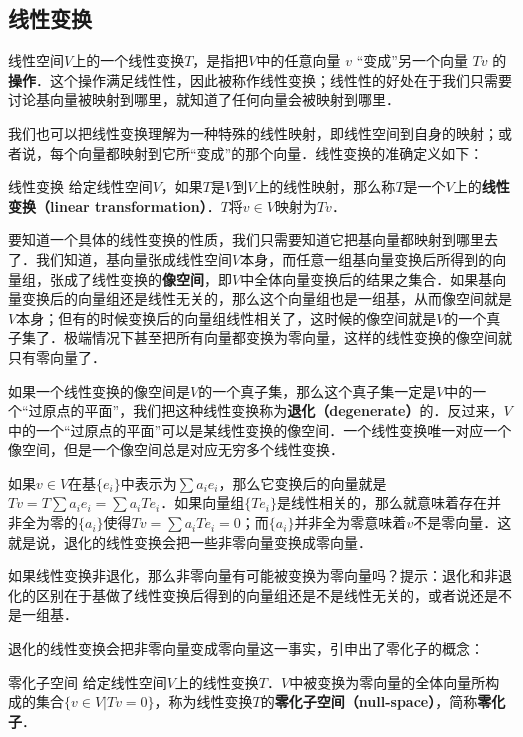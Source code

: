 \subsection{线性变换}
线性空间$V$上的一个线性变换$T$，是指把$V$中的任意向量 ${v}$ “变成”另一个向量 $T {v}$ 的\textbf{操作}．这个操作满足线性性，因此被称作线性变换；线性性的好处在于我们只需要讨论基向量被映射到哪里，就知道了任何向量会被映射到哪里．

我们也可以把线性变换理解为一种特殊的线性映射，即线性空间到自身的映射；或者说，每个向量都映射到它所“变成”的那个向量．线性变换的准确定义如下：

\begin{definition}{线性变换}
给定线性空间$V$，如果$T$是$V$到$V$上的线性映射，那么称$T$是一个$V$上的\textbf{线性变换（linear transformation）}．$T$将${v}\in V$映射为$T{v}$．
\end{definition}

要知道一个具体的线性变换的性质，我们只需要知道它把基向量都映射到哪里去了．我们知道，基向量张成线性空间$V$本身，而任意一组基向量变换后所得到的向量组，张成了线性变换的\textbf{像空间}，即$V$中全体向量变换后的结果之集合．如果基向量变换后的向量组还是线性无关的，那么这个向量组也是一组基，从而像空间就是$V$本身；但有的时候变换后的向量组线性相关了，这时候的像空间就是$V$的一个真子集了．极端情况下甚至把所有向量都变换为零向量，这样的线性变换的像空间就只有零向量了．

如果一个线性变换的像空间是$V$的一个真子集，那么这个真子集一定是$V$中的一个“过原点的平面”，我们把这种线性变换称为\textbf{退化（degenerate）}的．反过来，$V$中的一个“过原点的平面”可以是某线性变换的像空间．一个线性变换唯一对应一个像空间，但是一个像空间总是对应无穷多个线性变换．

如果${v}\in V$在基$\{{e}_i\}$中表示为$\sum a_i {e}_i$，那么它变换后的向量就是$T {v}=T\sum a_i {e}_i=\sum a_iT {e}_i$．如果向量组$\{T {e}_i\}$是线性相关的，那么就意味着存在并非全为零的$\{a_i\}$使得$T {v}=\sum a_iT {e}_i=0$；而$\{a_i\}$并非全为零意味着${v}$不是零向量．这就是说，退化的线性变换会把一些非零向量变换成零向量．

\begin{exercise}{}
如果线性变换非退化，那么非零向量有可能被变换为零向量吗？提示：退化和非退化的区别在于基做了线性变换后得到的向量组还是不是线性无关的，或者说还是不是一组基．
\end{exercise}

退化的线性变换会把非零向量变成零向量这一事实，引申出了零化子的概念：

\begin{definition}{零化子空间}
给定线性空间$V$上的线性变换$T$．$V$中被变换为零向量的全体向量所构成的集合$\{{v}\in V|T{v}= {0}\}$，称为线性变换$T$的\textbf{零化子空间（null-space）}，简称\textbf{零化子}．
\end{definition}

